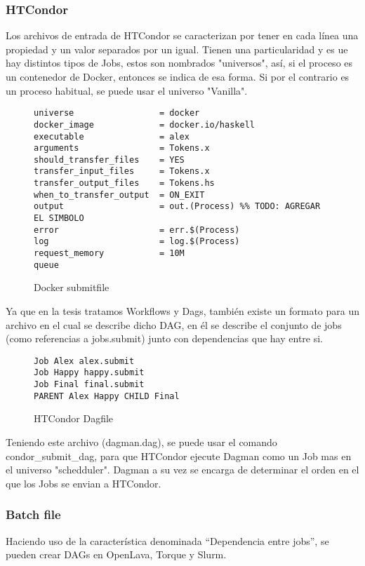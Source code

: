 \subsubsection{HTCondor}
Los archivos de entrada de HTCondor se caracterizan por tener en cada línea una propiedad y un valor separados por un igual. Tienen una particularidad y es ue hay distintos tipos de Jobs, estos son nombrados "universos", así, si el proceso es un contenedor de Docker, entonces se indica de esa forma. Si por el contrario es un proceso habitual, se puede usar el universo "Vanilla".

\begin{figure}
\begin{lstlisting}
universe                 = docker
docker_image             = docker.io/haskell
executable               = alex
arguments                = Tokens.x
should_transfer_files    = YES
transfer_input_files     = Tokens.x
transfer_output_files    = Tokens.hs
when_to_transfer_output  = ON_EXIT
output                   = out.(Process) %% TODO: AGREGAR EL SIMBOLO
error                    = err.$(Process)
log                      = log.$(Process)
request_memory           = 10M
queue
\end{lstlisting}
\caption{Docker submitfile}
\end{figure}

Ya que en la tesis tratamos Workflows y Dags, también existe un formato para un archivo en el cual se describe dicho DAG, en él se describe el conjunto de jobs (como referencias a jobs.submit) junto con dependencias que hay entre si.\\

\begin{figure}
\begin{lstlisting}
Job Alex alex.submit
Job Happy happy.submit
Job Final final.submit
PARENT Alex Happy CHILD Final
\end{lstlisting}
\caption{HTCondor Dagfile}
\end{figure}

Teniendo este archivo (dagman.dag), se puede usar el comando condor\_submit\_dag, para que HTCondor ejecute Dagman como un Job mas en el universo "schedduler". Dagman a su vez se encarga de determinar el orden en el que los Jobs se envian a HTCondor.

\subsubsection{Batch file}
Haciendo uso de la característica denominada “Dependencia entre jobs”, se pueden crear DAGs en OpenLava, Torque y Slurm.

